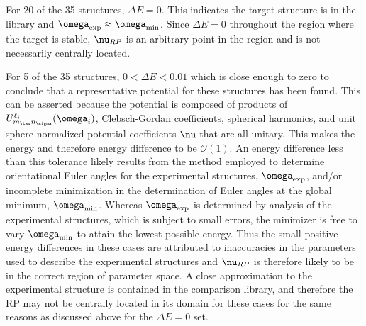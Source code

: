 \documentclass[preprint]{iucr}              %
\newcommand{\mb}[1]{\ensuremath{\mbox{\boldmath $ #1 $}}}
\begin{document}
For 20 of the 35 structures, $\Delta E=0$.  This indicates the
target structure is in the library and
$\mb{\omega}_{\mathrm{exp}}\approx \mb{\omega}_{\mathrm{min}}$.
Since $\Delta E=0$ throughout the region where the target is stable,
$\mb{\nu}_{RP}$ is an arbitrary point in the region and is not
necessarily centrally located.


For 5 of the 35 structures, $0< \Delta E < 0.01$ which is close enough to zero to conclude that a representative potential for these structures has been found.
This can be asserted because the potential is composed of products
of $U^{\ell_i}_{m_\tau n_\sigma}(\mb{\omega}_i)$, Clebsch-Gordan
coefficients, spherical harmonics, and unit sphere normalized
potential coefficients $\mb{\nu}$ that are all unitary.  This makes
the energy and therefore energy difference to be $\mathcal{O}(1)$.
An energy difference less than this tolerance likely results from the method employed to determine orientational Euler angles for the experimental structures, $\mb{\omega}_{\mathrm{exp}}$, and/or incomplete minimization in the determination of Euler angles at the global minimum,
$\mb{\omega}_{\mathrm{min}}$.  Whereas $\mb{\omega}_{\mathrm{exp}}$ is determined by analysis of the experimental structures, which is subject to small errors, the minimizer is free to vary $\mb{\omega}_{\mathrm{min}}$ to attain the lowest possible energy.  Thus the small positive energy differences in these cases are attributed to inaccuracies in the parameters used to describe the experimental structures and 
$\mb{\nu}_{RP}$ is therefore likely to be in the correct region of parameter space.  A close approximation to the experimental structure is contained in the comparison library, and therefore the RP may not be centrally located in its domain for these cases for the same reasons as discussed above for the $\Delta E = 0$ set. 
\end{document}
